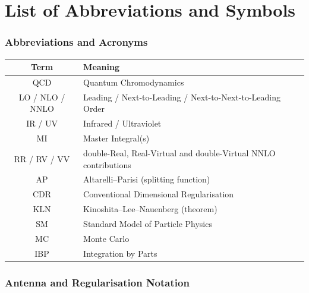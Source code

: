\chapter*{List of Abbreviations and Symbols}


\renewcommand{\arraystretch}{1.3}

\subsection*{Abbreviations and Acronyms}

\begin{longtable}{|c|p{10.5cm}|}
    \hline
    \textbf{Term} & \textbf{Meaning} \\
    \hline
    \endhead
    QCD & Quantum Chromodynamics \\ \hline
    LO / NLO / NNLO & Leading / Next-to-Leading / Next-to-Next-to-Leading Order \\ \hline
    IR / UV & Infrared / Ultraviolet \\ \hline
    MI & Master Integral(s) \\ \hline
    RR / RV / VV & double-Real, Real-Virtual and double-Virtual NNLO contributions \\ \hline
    AP & Altarelli--Parisi (splitting function) \\ \hline
    CDR & Conventional Dimensional Regularisation \\ \hline
    KLN & Kinoshita--Lee--Nauenberg (theorem) \\ \hline
    SM & Standard Model of Particle Physics \\ \hline
    
    
    MC & Monte Carlo \\ \hline
    IBP & Integration by Parts \\ \hline
\end{longtable}

\subsection*{Antenna and Regularisation Notation}

